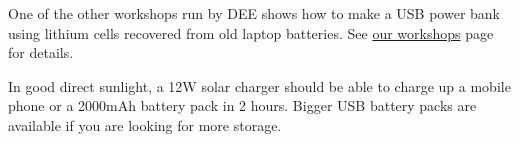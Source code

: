 \documentclass{article}
\theoremstyle{definition}
\theoremstyle{definition}
\theoremstyle{remark}
\begin{document}
    One of the other workshops run by DEE shows how to make a USB power bank using lithium cells recovered from old laptop batteries. See \href{https://www.demandenergyequality.org/our-workshops}{our workshops} page for details.

    In good direct sunlight, a 12W solar charger should be able to charge up a mobile phone or a 2000mAh battery pack in 2 hours. Bigger USB battery packs are available if you are looking for more storage.


\end{document}
